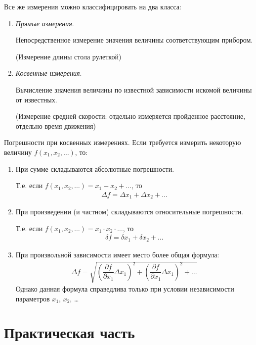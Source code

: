 \documentclass[a4paper, usenames, dvipsnames]{article}
\begin{document}
Все же измерения можно классифицировать на два класса:
\begin{enumerate}
    \item {\it Прямые измерения}.
    
    Непосредственное измерение значения величины соответствующим прибором.

    (Измерение длины стола рулеткой)
    \item {\it Косвенные измерения}.
    
    Вычисление значения величины по известной зависимости искомой
    величины от известных.

    (Измерение средней скорости: отдельно измеряется пройденное расстояние,
    отдельно время движения)
\end{enumerate}

Погрешности при косвенных измерениях.
Если требуется измерить некоторую величину $f(x_1, x_2, \ldots)$, то:
\begin{enumerate}
    \item При сумме складываются абсолютные погрешности.
    
    Т.е. если $f(x_1, x_2, \ldots) = x_1 + x_2 + \ldots$, то
    \begin{gather*}
        \Delta f = \Delta x_1 + \Delta x_2 + \ldots
    \end{gather*}
    \item При произведении (и частном) складываются относительные погрешности.
    
    Т.е. если $f(x_1, x_2, \ldots) = x_1 \cdot x_2 \cdot \ldots$, то
    \begin{gather*}
        \delta f = \delta x_1 + \delta x_2 + \ldots
    \end{gather*}
    \item При произвольной зависимости имеет место более общая формула:
    \begin{gather*}
        \Delta f = \sqrt{\left(\dfrac{\partial f}{\partial x_1}\Delta x_1\right)^2 +
        \left(\dfrac{\partial f}{\partial x_1}\Delta x_1\right)^2 + \ldots}
    \end{gather*}
    Однако данная формула справедлива только при условии независимости параметров $x_1$, $x_2$, \ldots
\end{enumerate}

\newpage\section*{\centering Практическая часть}
\end{document}
